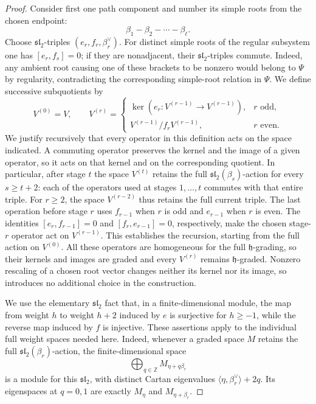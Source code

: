 \documentclass[11pt]{article}
\theoremstyle{definition}
\theoremstyle{remark}
\newcommand{\Z}{\mathbb Z}
\begin{document}
\begin{proof}
Consider first one path component and number its simple roots from the chosen
endpoint:
\[
             \beta_1-\beta_2-\cdots-\beta_\ell .
\]
Choose $\mathfrak{sl}_2$-triples $(e_r,f_r,\beta_r^\vee)$.  For distinct
simple roots of the regular subsystem one has $[e_r,f_s]=0$; if they are
nonadjacent, their $\mathfrak{sl}_2$-triples commute.  Indeed, any ambient
root causing one of these brackets to be nonzero would belong to $\Psi$ by
regularity, contradicting the corresponding simple-root relation in $\Psi$.
We define successive subquotients by
\[
 V^{(0)}=V,\qquad
 V^{(r)}=
 \begin{cases}
   \ker(e_r:V^{(r-1)}\to V^{(r-1)}),&r\text{ odd},\\[1mm]
   V^{(r-1)}/f_rV^{(r-1)},&r\text{ even}.
 \end{cases}
\]
We justify recursively that every operator in this definition acts on the
space indicated.  A commuting operator preserves the kernel and the image of
a given operator, so it acts on that kernel and on the corresponding
quotient.  In particular, after stage $t$ the space $V^{(t)}$ retains the
full $\mathfrak{sl}_2(\beta_s)$-action for every $s\ge t+2$: each of the
operators used at stages $1,\ldots,t$ commutes with that entire triple.
For $r\ge2$, the space $V^{(r-2)}$ thus retains the full current triple.
The last operation before stage $r$ uses $f_{r-1}$ when $r$ is odd and
$e_{r-1}$ when $r$ is even.  The identities
$[e_r,f_{r-1}]=0$ and $[f_r,e_{r-1}]=0$, respectively, make the chosen
stage-$r$ operator act on $V^{(r-1)}$.  This establishes the recursion,
starting from the full action on $V^{(0)}$.
All these operators are homogeneous for the full $\mathfrak h$-grading, so
their kernels and images are graded and every $V^{(r)}$ remains
$\mathfrak h$-graded.  Nonzero rescaling of a chosen root vector changes
neither its kernel nor its image, so introduces no additional choice in the
construction.

We use the elementary $\mathfrak{sl}_2$ fact that, in a finite-dimensional
module, the map from weight $h$ to weight $h+2$ induced by $e$ is surjective
for $h\ge-1$, while the reverse map induced by $f$ is injective.
These assertions apply to the individual full weight spaces needed here.
Indeed, whenever a graded space $M$ retains the full
$\mathfrak{sl}_2(\beta_r)$-action, the finite-dimensional space
\[
             \bigoplus_{q\in\Z}M_{\eta+q\beta_r}
\]
is a module for this $\mathfrak{sl}_2$, with distinct Cartan eigenvalues
$\langle\eta,\beta_r^\vee\rangle+2q$.  Its eigenspaces at $q=0,1$ are
exactly $M_\eta$ and $M_{\eta+\beta_r}$.


\end{proof}
\end{document}
